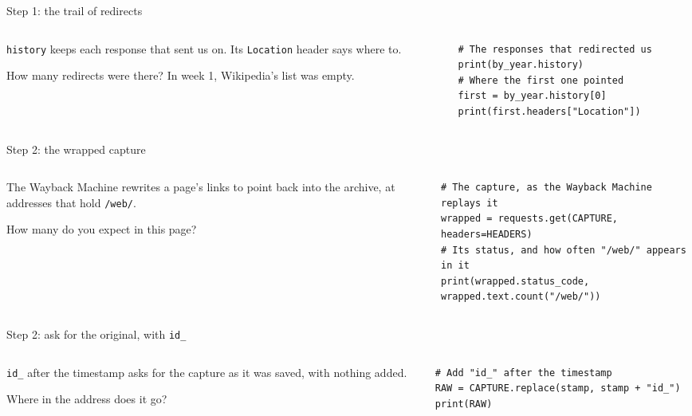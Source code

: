 \documentclass[9pt,aspectratio=169]{beamer}
\begin{document}
\begin{frame}[fragile]{Step 1: the trail of redirects}
    \begin{columns}[T]
        \begin{column}{0.37\textwidth}
            \texttt{history} keeps each response that sent us on. Its \texttt{Location} header says where to.

            \medskip
            How many redirects were there? In week 1, Wikipedia's list was empty.
        \end{column}
        \begin{column}{0.6\textwidth}
\begin{lstlisting}
# The responses that redirected us
print(by_year.history)
# Where the first one pointed
first = by_year.history[0]
print(first.headers["Location"])
\end{lstlisting}
        \end{column}
    \end{columns}
\end{frame}

\begin{frame}[fragile]{Step 2: the wrapped capture}
    \begin{columns}[T]
        \begin{column}{0.37\textwidth}
            The Wayback Machine rewrites a page's links to point back into the archive, at addresses that hold \texttt{/web/}.

            \medskip
            How many do you expect in this page?
        \end{column}
        \begin{column}{0.6\textwidth}
\begin{lstlisting}
# The capture, as the Wayback Machine replays it
wrapped = requests.get(CAPTURE, headers=HEADERS)
# Its status, and how often "/web/" appears in it
print(wrapped.status_code, wrapped.text.count("/web/"))
\end{lstlisting}
        \end{column}
    \end{columns}
\end{frame}

\begin{frame}[fragile]{Step 2: ask for the original, with \texttt{id\_}}
    \begin{columns}[T]
        \begin{column}{0.37\textwidth}
            \texttt{id\_} after the timestamp asks for the capture as it was saved, with nothing added.

            \medskip
            Where in the address does it go?
        \end{column}
        \begin{column}{0.6\textwidth}
\begin{lstlisting}
# Add "id_" after the timestamp
RAW = CAPTURE.replace(stamp, stamp + "id_")
print(RAW)
\end{lstlisting}
        \end{column}
    \end{columns}
\end{frame}
\end{document}
